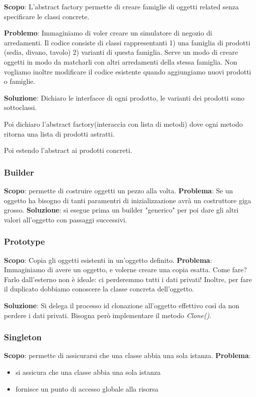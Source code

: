 \documentclass{article}
\begin{document}
\textbf{Scopo}: L'abstract factory permette di creare famiglie di oggetti related senza specificare
le classi concrete.

\textbf{Problemo}: Immaginiamo di voler creare un simulatore di negozio di arredamenti. Il codice consiste di
classi rappresentanti 1) una famiglia di prodotti (sedia, divano, tavolo) 2) varianti di questa famiglia. Serve
un modo di creare oggetti in modo da matcharli con altri arredamenti della stessa famiglia. Non vogliamo
inoltre modificare il codice esistente quando aggiungiamo nuovi prodotti o famiglie.

\textbf{Soluzione}: Dichiaro le interfacce di ogni prodotto, le varianti dei prodotti
sono sottoclassi.

Poi dichiaro l'abstract factory(interaccia con lista di metodi) dove ogni metodo ritorna
una lista di prodotti astratti.

Poi estendo l'abstract ai prodotti concreti.

\subsubsection{Builder}
\textbf{Scopo}: permette di costruire oggetti un pezzo alla volta.
\textbf{Problema}: Se un oggetto ha bisogno di tanti paramentri di inizializzazione avrà un costruttore giga grosso.
\textbf{Soluzione}: si esegue prima un builder "generico" per poi dare gli altri valori all'oggetto 
con passaggi successivi.

\subsubsection{Prototype}
\textbf{Scopo}: Copia gli oggetti esistenti in un'oggetto definito.
\textbf{Problema}: Immaginiamo di avere un oggetto, e volerne creare una copia esatta. Come fare? Farlo
dall'esterno non è ideale: ci perderemmo tutti i dati privati! Inoltre, per fare il duplicato dobbiamo
conoscere la classe concreta dell'oggetto.

\textbf{Soluzione}: Si delega il processo id clonazione all'oggetto effettivo così da non perdere i dati privati.
Bisogna però implementare il metodo \textit{Clone()}.

\subsubsection{Singleton}
\textbf{Scopo}: permette di assicurarsi che una classe abbia una sola istanza.
\textbf{Problema}: 
\begin{itemize}
    \item si assicura che una classe abbia una sola istanza
    \item fornisce un punto di accesso globale alla risorsa
\end{itemize}
\end{document}
